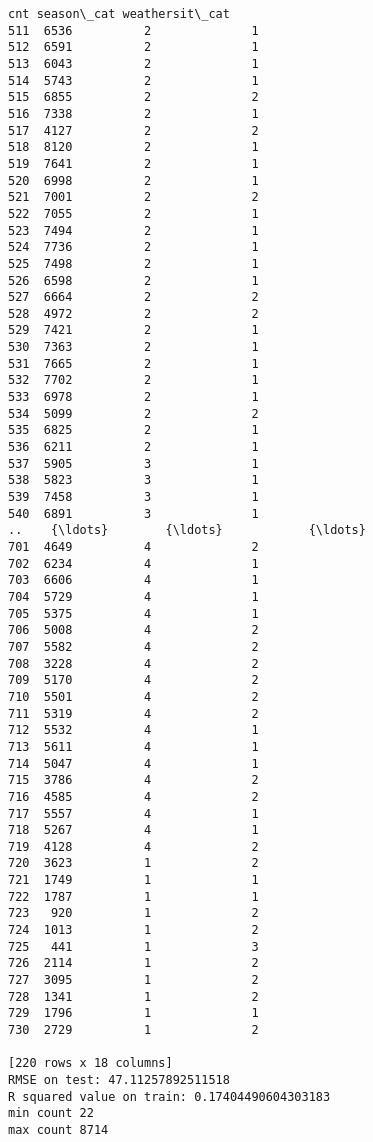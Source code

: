 \documentclass[11pt]{article}
\begin{document}
\begin{Verbatim}[commandchars=\\\{\}]
      cnt season\_cat weathersit\_cat  
511  6536          2              1  
512  6591          2              1  
513  6043          2              1  
514  5743          2              1  
515  6855          2              2  
516  7338          2              1  
517  4127          2              2  
518  8120          2              1  
519  7641          2              1  
520  6998          2              1  
521  7001          2              2  
522  7055          2              1  
523  7494          2              1  
524  7736          2              1  
525  7498          2              1  
526  6598          2              1  
527  6664          2              2  
528  4972          2              2  
529  7421          2              1  
530  7363          2              1  
531  7665          2              1  
532  7702          2              1  
533  6978          2              1  
534  5099          2              2  
535  6825          2              1  
536  6211          2              1  
537  5905          3              1  
538  5823          3              1  
539  7458          3              1  
540  6891          3              1  
..    {\ldots}        {\ldots}            {\ldots}  
701  4649          4              2  
702  6234          4              1  
703  6606          4              1  
704  5729          4              1  
705  5375          4              1  
706  5008          4              2  
707  5582          4              2  
708  3228          4              2  
709  5170          4              2  
710  5501          4              2  
711  5319          4              2  
712  5532          4              1  
713  5611          4              1  
714  5047          4              1  
715  3786          4              2  
716  4585          4              2  
717  5557          4              1  
718  5267          4              1  
719  4128          4              2  
720  3623          1              2  
721  1749          1              1  
722  1787          1              1  
723   920          1              2  
724  1013          1              2  
725   441          1              3  
726  2114          1              2  
727  3095          1              2  
728  1341          1              2  
729  1796          1              1  
730  2729          1              2  

[220 rows x 18 columns]
RMSE on test: 47.11257892511518
R squared value on train: 0.17404490604303183
min count 22
max count 8714

    \end{Verbatim}


    
    
    
    
\end{document}
